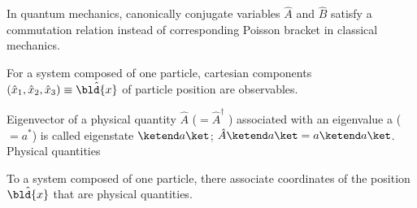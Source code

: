 In quantum mechanics, canonically conjugate variables $\hat{A}$ and $\hat{B}$
satisfy a commutation relation instead of  corresponding  Poisson bracket in
classical mechanics. 


For a system composed of one particle, cartesian components $(\hat{x}_1, \hat{x}_2, \hat{x}_3) \equiv \hat{\bld{x}}$
of particle position are observables. 

Eigenvector of a physical quantity $\hat{A}$ ($=\hat{A}^\dagger$ ) associated with 
an eigenvalue a ($= a^*$) is called eigenstate $\ketend a \ket$;
$\hat{A} \ketend a \ket = a \ketend a \ket$.
Physical quantities 

To a system composed of one particle, 
there associate coordinates of the position $\hat{\bld{x}}$ that are
physical quantities.



\bigskip

